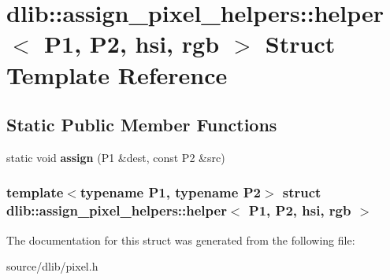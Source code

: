 \hypertarget{structdlib_1_1assign__pixel__helpers_1_1helper_3_01P1_00_01P2_00_01hsi_00_01rgb_01_4}{
\section{dlib::assign\_\-pixel\_\-helpers::helper$<$ P1, P2, hsi, rgb $>$ Struct Template Reference}
\label{structdlib_1_1assign__pixel__helpers_1_1helper_3_01P1_00_01P2_00_01hsi_00_01rgb_01_4}
}
\subsection*{Static Public Member Functions}
\begin{DoxyCompactItemize}
\item 
\hypertarget{structdlib_1_1assign__pixel__helpers_1_1helper_3_01P1_00_01P2_00_01hsi_00_01rgb_01_4_af0ef95c3b1e16d299e3e26d260b8c951}{
static void {\bfseries assign} (P1 \&dest, const P2 \&src)}
\label{structdlib_1_1assign__pixel__helpers_1_1helper_3_01P1_00_01P2_00_01hsi_00_01rgb_01_4_af0ef95c3b1e16d299e3e26d260b8c951}

\end{DoxyCompactItemize}
\subsubsection*{template$<$typename P1, typename P2$>$ struct dlib::assign\_\-pixel\_\-helpers::helper$<$ P1, P2, hsi, rgb $>$}



The documentation for this struct was generated from the following file:\begin{DoxyCompactItemize}
\item 
source/dlib/pixel.h\end{DoxyCompactItemize}
